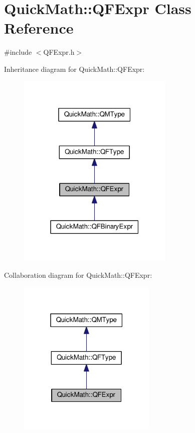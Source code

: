 \hypertarget{classQuickMath_1_1QFExpr}{}\section{Quick\+Math\+:\+:Q\+F\+Expr Class Reference}
\label{classQuickMath_1_1QFExpr}


{\ttfamily \#include $<$Q\+F\+Expr.\+h$>$}



Inheritance diagram for Quick\+Math\+:\+:Q\+F\+Expr\+:
\nopagebreak
\begin{figure}[H]
\begin{center}
\leavevmode
\includegraphics[width=211pt]{classQuickMath_1_1QFExpr__inherit__graph}
\end{center}
\end{figure}


Collaboration diagram for Quick\+Math\+:\+:Q\+F\+Expr\+:
\nopagebreak
\begin{figure}[H]
\begin{center}
\leavevmode
\includegraphics[width=187pt]{classQuickMath_1_1QFExpr__coll__graph}
\end{center}
\end{figure}
